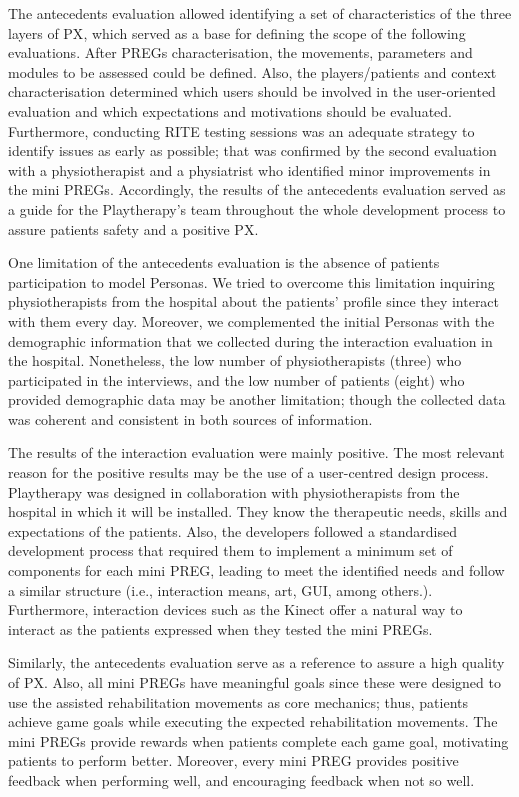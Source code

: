 The antecedents evaluation allowed identifying a set of characteristics of the three layers of \ac{PX}, which served as a base for defining the scope of the following evaluations. After \acp{PREG} characterisation, the movements, parameters and modules to be assessed could be defined. Also, the players/patients and context characterisation determined which users should be involved in the user-oriented evaluation and which expectations and motivations should be evaluated. Furthermore, conducting \ac{RITE} testing sessions was an adequate strategy to identify issues as early as possible; that was confirmed by the second evaluation with a physiotherapist and a physiatrist who identified minor improvements in the mini \acp{PREG}. Accordingly, the results of the antecedents evaluation served as a guide for the Playtherapy's team throughout the whole development process to assure patients safety and a positive \ac{PX}. 

One limitation of the antecedents evaluation is the absence of patients participation to model Personas. We tried to overcome this limitation inquiring physiotherapists from the hospital about the patients' profile since they interact with them every day. Moreover, we complemented the initial Personas with the demographic information that we collected during the interaction evaluation in the hospital. Nonetheless, the low number of physiotherapists (three) who participated in the interviews, and the low number of patients (eight) who provided demographic data may be another limitation; though the collected data was coherent and consistent in both sources of information.

The results of the interaction evaluation were mainly positive. The most relevant reason for the positive results may be the use of a user-centred design process. Playtherapy was designed in collaboration with physiotherapists from the hospital in which it will be installed. They know the therapeutic needs, skills and expectations of the patients. Also, the developers followed a standardised development process that required them to implement a minimum set of components for each mini \ac{PREG}, leading to meet the identified needs and follow a similar structure (i.e., interaction means, art, \ac{GUI}, among others.). Furthermore, interaction devices such as the Kinect offer a natural way to interact as the patients expressed when they tested the mini \acp{PREG}.

Similarly, the antecedents evaluation serve as a reference to assure a high quality of \ac{PX}. Also, all mini \acp{PREG} have meaningful goals since these were designed to use the assisted rehabilitation movements as core mechanics; thus, patients achieve game goals while executing the expected rehabilitation movements. The mini \acp{PREG} provide rewards when patients complete each game goal, motivating patients to perform better. Moreover, every mini \ac{PREG} provides positive feedback when performing well, and encouraging feedback when not so well. 

